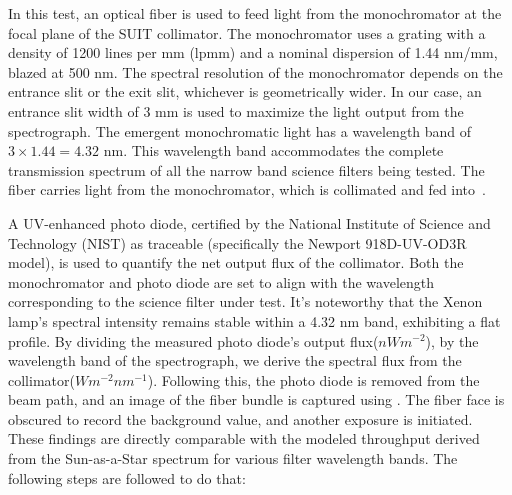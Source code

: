 In this test, an optical fiber is used to feed light from the monochromator at the focal plane of the SUIT collimator. The monochromator uses a grating with a density of 1200 lines per mm (lpmm) and a nominal dispersion of 1.44 nm/mm, blazed at 500 nm. The spectral resolution of the monochromator depends on the entrance slit or the exit slit, whichever is geometrically wider. In our case, an entrance slit width of 3 mm is used to maximize the light output from the spectrograph. The emergent monochromatic light has a wavelength band of \(3 \times 1.44 = 4.32\) nm. This wavelength band accommodates the complete transmission spectrum of all the narrow band science filters being tested. The fiber carries light from the monochromator, which is collimated and fed into~\suit.

A UV-enhanced photo diode, certified by the National Institute of Science and Technology (NIST) as traceable (specifically the Newport 918D-UV-OD3R model), is used to quantify the net output flux of the collimator. Both the monochromator and photo diode are set to align with the wavelength corresponding to the science filter under test. It's noteworthy that the Xenon lamp's spectral intensity remains stable within a 4.32 nm band, exhibiting a flat profile. By dividing the measured photo diode's output flux(\(nWm^{-2}\)), by the wavelength band of the spectrograph, we derive the spectral flux from the collimator(\(Wm^{-2}nm^{-1}\)). Following this, the photo diode is removed from the beam path, and an image of the fiber bundle is captured using \suit. The fiber face is obscured to record the background value, and another exposure is initiated. These findings are directly comparable with the modeled throughput derived from the Sun-as-a-Star spectrum for various filter wavelength bands. The following steps are followed to do that:

